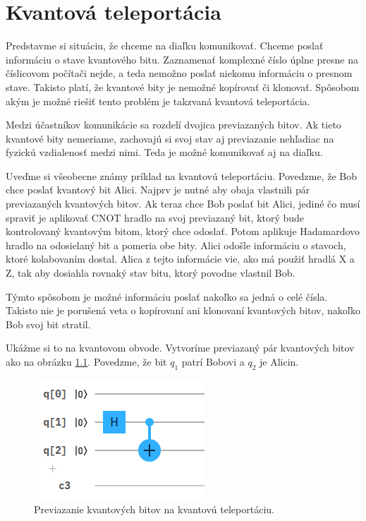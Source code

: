
\chapter{Kvantová teleportácia}

Predstavme si situáciu, že chceme na diaľku komunikovať. Chceme poslať
informáciu o stave kvantového bitu. Zaznamenať komplexné číslo úplne presne 
na číslicovom počítači nejde, a teda nemožno poslať niekomu informáciu o 
presnom stave. Takisto platí, že kvantové bity je nemožné kopírovať či
klonovať. Spôsobom akým je možné riešiť tento problém je takzvaná kvantová
teleportácia.

Medzi účastníkov komunikácie sa rozdelí dvojica previazaných bitov. Ak tieto
kvantové bity nemeriame, zachovajú si svoj stav aj previazanie nehľadiac
na fyzickú vzdialenosť medzi nimi. Teda je možné komunikovať aj na diaľku.

Uveďme si všeobecne známy príklad na kvantovú teleportáciu. Povedzme, že 
Bob chce poslať kvantový bit Alici. Najprv je nutné aby obaja vlastnili
pár previazaných kvantových bitov. Ak teraz chce Bob poslať bit Alici, jediné
čo musí spraviť je aplikovať CNOT hradlo na svoj previazaný bit, ktorý bude 
kontrolovaný kvantovým bitom, ktorý chce odoslať. Potom aplikuje Hadamardovo
hradlo na odosielaný bit a pomeria obe bity. Alici odošle informáciu o
stavoch, ktoré kolabovaním dostal. Alica z tejto informácie vie, ako má použiť
hradlá X a Z, tak aby dosiahla rovnaký stav bitu, ktorý povodne vlastnil Bob.

Týmto spôsobom je možné informáciu poslať nakoľko sa jedná o celé čísla.
Takisto nie je porušená veta o kopírovaní ani klonovaní kvantových bitov, 
nakoľko Bob svoj bit stratil.

Ukážme si to na kvantovom obvode. Vytvoríme previazaný pár kvantových bitov
ako na obrázku \ref{tel_c1}. Povedzme, že bit \(q_1\) patrí Bobovi a \(q_2\)
je Alicin.

\begin{figure}[H]
	\centering 
	\includegraphics[width=.5\textwidth]{figures/tel_c1.png} 
	\caption{Previazanie kvantových bitov na kvantovú teleportáciu.}
    \label{tel_c1}
\end{figure}

